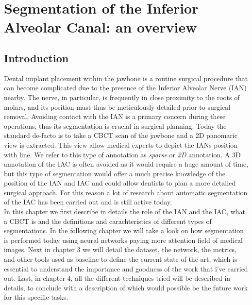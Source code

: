 
\chapter{Segmentation of the Inferior Alveolar Canal: an overview}

\label{chp:introductive_chapter}

\def\:{\hskip0pt} %

\section{Introduction}
Dental implant placement within the jawbone is a routine surgical procedure that
can become complicated due to the presence of the Inferior Alveolar Nerve (IAN)
nearby. The nerve, in particular, is frequently in close proximity to the roots
of molars, and its position must thus be meticulously detailed prior to surgical
removal. Avoiding contact with the IAN is a primary concern during these
operations, thus its segmentation is crucial in surgical planning.
Today the standard de-facto is to take a CBCT scan of the jawbone and a 2D
panomaric view is extracted. This view allow medical experts to depict the IANs
position with line. We refer to this type of annotation as \emph{sparse} or
\emph{2D} annotation. A 3D annotation of the IAC is often avoided as it would
require a huge amount of time, but this type of segmentation would offer a much
precise knowledge of the position of the IAN and IAC and could allow dentists to
plan a more detailed surgical approach. For this reason a lot of research about
automatic segmentation of the IAC has been carried out and is still active today.\\

In this chapter we first describe in details the role of the IAN and the IAC,
what a CBCT is and the definitions and carachteristics of different types of
segmentations.
In the following chapter we will take a look on how segmentation is performed
today using neural networks paying more attention field of medical images.
Next in chapter 3 we will detail the dataset, the network, the metrics, and
other tools used as baseline to define the current state of the art, which is
essential to understand the importance and goodness of the work that i've
carried out. Last, in chapter 4, all the different techniques tried will be
described in details, to conclude with a description of which would possible be
the future work for this specific tasks.

